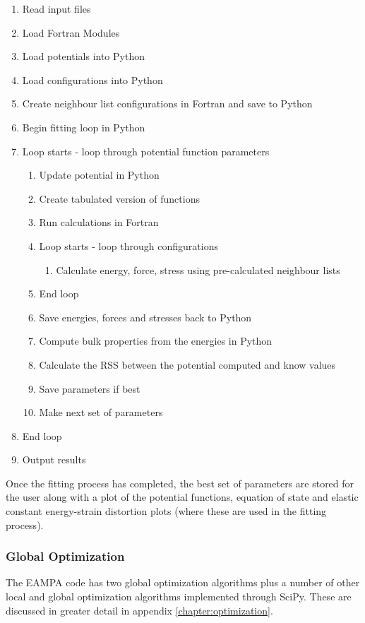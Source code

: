 \begin{enumerate}
\item Read input files
\item Load Fortran Modules
\item Load potentials into Python
\item Load configurations into Python
\item Create neighbour list configurations in Fortran and save to Python
\item Begin fitting loop in Python
\item Loop starts - loop through potential function parameters
\begin{enumerate}
\item Update potential in Python
\item Create tabulated version of functions
\item Run calculations in Fortran
\item Loop starts - loop through configurations
\begin{enumerate}
\item Calculate energy, force, stress using pre-calculated neighbour lists
\end{enumerate}
\item End loop
\item Save energies, forces and stresses back to Python
\item Compute bulk properties from the energies in Python
\item Calculate the RSS between the potential computed and know values
\item Save parameters if best
\item Make next set of parameters
\end{enumerate}
\item End loop
\item Output results
\end{enumerate}

Once the fitting process has completed, the best set of parameters are stored for the user along with a plot of the potential functions, equation of state and elastic constant energy-strain distortion plots (where these are used in the fitting process).




\subsubsection{Global Optimization}

The EAMPA code has two global optimization algorithms plus a number of other local and global optimization algorithms implemented through SciPy.  These are discussed in greater detail in appendix \ref{chapter:optimization}.

